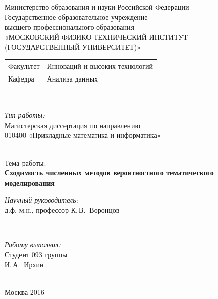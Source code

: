\documentclass[12pt]{article}
\begin{document}
\begin{titlepage}

\begin{center}

Министерство образования и науки Российской Федерации\\[1em]
Государственное образовательное учреждение\\
высшего профессионального образования \\
«МОСКОВСКИЙ ФИЗИКО-ТЕХНИЧЕСКИЙ ИНСТИТУТ \\
(ГОСУДАРСТВЕННЫЙ УНИВЕРСИТЕТ)»\\[1em]

\begin{minipage}{\textwidth}
\begin{flushleft}
\begin{tabular}{ l l }
Факультет & Инноваций и высоких технологий\\
Кафедра & Анализа данных
\end{tabular}
\end{flushleft}
\end{minipage}\\[1em]

\begin{minipage}{\textwidth}
\begin{flushright}
\textit{Тип работы:}\\
Магистерская диссертация по направлению\\
010400 «Прикладные математика и информатика»
\end{flushright}
\end{minipage}\\[5em]


{Тема работы:}\\[1em]
\textbf{\large Сходимость численных методов вероятностного тематического моделирования}\\[6em]

\begin{minipage}{\textwidth}
\begin{flushright}
\textit{Научный руководитель:}\\
\underline{\hspace*{2.5cm}} д.ф.-м.н., профессор К.\,В.~Воронцов
\end{flushright}
\end{minipage}\\[3em]

\begin{minipage}{\textwidth}
\begin{flushright}
\textit{Работу выполнил:}\\
Студент 093 группы\\
\underline{\hspace*{2.5cm}} И.\,А.~Ирхин
\end{flushright}
\end{minipage}\\[3em]

\vfill
{\normalsize Москва 2016}
\end{center}
\end{titlepage}
\end{document}
